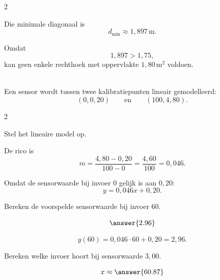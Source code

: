 \documentclass{ximera}
\begin{document}
\begin{oefening}{\oefG}
\begin{multicols}{2}
\begin{question}
\begin{oplossing}
    Die minimale diagonaal is
    \[
    d_{\min}\approx1{,}897\,\mathrm m.
    \]
    
    Omdat
    \[
    1{,}897>1{,}75,
    \]
    kan geen enkele rechthoek met oppervlakte $1{,}80\,\mathrm{m^2}$ voldoen.
    \end{oplossing}
    \end{question}
    
    \end{multicols}
    
    \end{oefening}
    
    
    \begin{oefening}{\oefG}
    \\
    
    Een sensor wordt tussen twee kalibratiepunten lineair gemodelleerd:
    \[
    (0,0{,}20)
    \qquad\text{en}\qquad
    (100,4{,}80).
    \]
    
    \begin{multicols}{2}
    
    \begin{question}
    Stel het lineaire model op.
    
    \begin{oplossing}
    De rico is
    \[
    m=
    \frac{4{,}80-0{,}20}{100-0}
    =\frac{4{,}60}{100}
    =0{,}046.
    \]
    
    Omdat de sensorwaarde bij invoer $0$ gelijk is aan $0{,}20$:
    \[
    \boxed{y=0{,}046x+0{,}20}.
    \]
    \end{oplossing}
    \end{question}
    
    
    \begin{question}
    Bereken de voorspelde sensorwaarde bij invoer $60$.
    
    \[
    \answer{2.96}
    \]
    
    \begin{oplossing}
    \[
    y(60)
    =0{,}046\cdot60+0{,}20
    =2{,}96.
    \]
    \end{oplossing}
    \end{question}
    
    
    \begin{question}
    Bereken welke invoer hoort bij sensorwaarde $3{,}00$.
    
    \[
    x\approx\answer{60.87}
    \]
    

\end{question}
\end{multicols}
\end{oefening}
\end{document}

